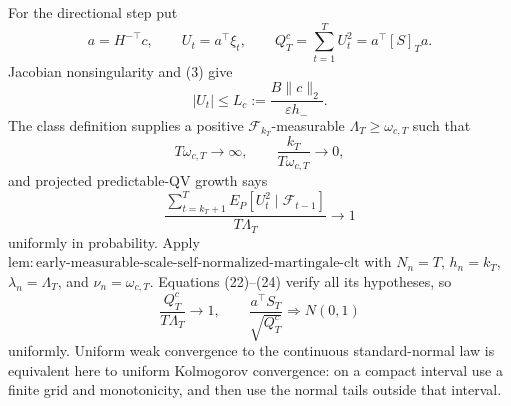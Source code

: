 For the directional step put
\[
 a=H^{-\top}c,\qquad U_t=a^\top\xi_t,\qquad
 Q_T^c=\sum_{t=1}^TU_t^2=a^\top[S]_Ta.
\tag{21}
\]
Jacobian nonsingularity and (3) give
\[
 |U_t|\le L_c:=\frac{B\|c\|_2}{\varepsilon h_-}.
\tag{22}
\]
The class definition supplies a positive \(\mathcal F_{k_T}\)-measurable \(\Lambda_T\ge\omega_{c,T}\) such that
\[
 T\omega_{c,T}\longrightarrow\infty,
 \qquad \frac{k_T}{T\omega_{c,T}}\longrightarrow0,
\tag{23}
\]
and projected predictable-QV growth says
\[
 \frac{\sum_{t=k_T+1}^TE_P[U_t^2\mid\mathcal F_{t-1}]}
 {T\Lambda_T}\longrightarrow1
\tag{24}
\]
uniformly in probability. Apply \(\mathrm{lem:early\text{-}measurable\text{-}scale\text{-}self\text{-}normalized\text{-}martingale\text{-}clt}\) with \(N_n=T\), \(h_n=k_T\), \(\lambda_n=\Lambda_T\), and \(\nu_n=\omega_{c,T}\). Equations (22)--(24) verify all its hypotheses, so
\[
 \frac{Q_T^c}{T\Lambda_T}\longrightarrow1,
 \qquad \frac{a^\top S_T}{\sqrt{Q_T^c}}\Rightarrow N(0,1)
\tag{25}
\]
uniformly. Uniform weak convergence to the continuous standard-normal law is equivalent here to uniform Kolmogorov convergence: on a compact interval use a finite grid and monotonicity, and then use the normal tails outside that interval.

